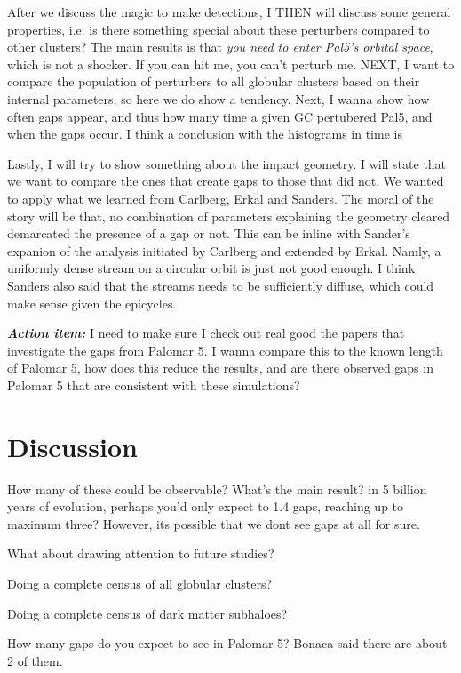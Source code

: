 \documentclass[draft]{aa}
\begin{document}
  
  
  After we discuss the magic to make detections, I THEN will discuss some general properties, i.e. is there something special about these perturbers compared to other clusters? The main results is that \textit{you need to enter Pal5's orbital space}, which is not a shocker. If you can hit me, you can't perturb me. NEXT, I want to compare the population of perturbers to all globular clusters based on their internal parameters, so here we do show a tendency. Next, I wanna show how often gaps appear, and thus how many time a given GC pertubered Pal5, and when the gaps occur. I think a conclusion with the histograms in time is 

  Lastly, I will try to show something about the impact geometry. I will state that we want to compare the ones that create gaps to those that did not. We wanted to apply what we learned from Carlberg, Erkal and Sanders. The moral of the story will be that, no combination of parameters explaining the geometry cleared demarcated the presence of a gap or not. This can be inline with Sander's expanion of the analysis initiated by Carlberg and extended by Erkal. Namly, a uniformly dense stream on a circular orbit is just not good enough. I think Sanders also said that the streams needs to be sufficiently diffuse, which could make sense given the epicycles. 


  \textbf{\textit{Action item:}} I need to make sure I check out real good the papers that investigate the gaps from Palomar 5. I wanna compare this to the known length of Palomar 5, how does this reduce the results, and are there observed gaps in Palomar 5 that are consistent with these simulations? 



  \section{Discussion}
    How many of these could be observable? What's the main result? in 5 billion years of evolution, perhaps you'd only expect to 1.4 gaps, reaching up to maximum three? However, its possible that we dont see gaps at all for sure. 

    What about drawing attention to future studies? 

    Doing a complete census of all globular clusters? 

    Doing a complete census of dark matter subhaloes? 

    How many gaps do you expect to see in Palomar 5? Bonaca said there are about 2 of them. 
\end{document}
